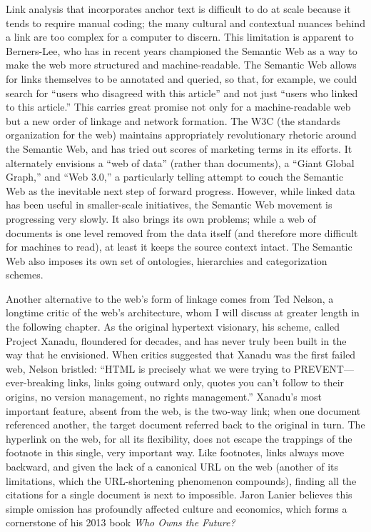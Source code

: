 Link analysis that incorporates anchor text is difficult to do at scale because it tends to require manual coding; the many cultural and contextual nuances behind a link are too complex for a computer to discern. This limitation is apparent to Berners-Lee, who has in recent years championed the Semantic Web as a way to make the web more structured and machine-readable. The Semantic Web allows for links themselves to be annotated and queried, so that, for example, we could search for ``users who disagreed with this article'' and not just ``users who linked to this article.'' This carries great promise not only for a machine-readable web but a new order of linkage and network formation. The W3C (the standards organization for the web) maintains appropriately revolutionary rhetoric around the Semantic Web, and has tried out scores of marketing terms in its efforts. It alternately envisions a ``web of data'' (rather than documents), a ``Giant Global Graph,'' and ``Web 3.0,'' a particularly telling attempt to couch the Semantic Web as the inevitable next step of forward progress. However, while linked data has been useful in smaller-scale initiatives, the Semantic Web movement is progressing very slowly. It also brings its own problems; while a web of documents is one level removed from the data itself (and therefore more difficult for machines to read), at least it keeps the source context intact. The Semantic Web also imposes its own set of ontologies, hierarchies and categorization schemes.

Another alternative to the web's form of linkage comes from Ted Nelson, a longtime critic of the web's architecture, whom I will discuss at greater length in the following chapter. As the original hypertext visionary, his scheme, called Project Xanadu, floundered for decades, and has never truly been built in the way that he envisioned. When critics suggested that Xanadu was the first failed web, Nelson bristled: ``HTML is precisely what we were trying to PREVENT—ever-breaking links, links going outward only, quotes you can't follow to their origins, no version management, no rights management.''  Xanadu's most important feature, absent from the web, is the two-way link; when one document referenced another, the target document referred back to the original in turn. The hyperlink on the web, for all its flexibility, does not escape the trappings of the footnote in this single, very important way. Like footnotes, links always move backward, and given the lack of a canonical URL on the web (another of its limitations, which the URL-shortening phenomenon compounds), finding all the citations for a single document is next to impossible. Jaron Lanier believes this simple omission has profoundly affected culture and economics, which forms a cornerstone of his 2013 book \emph{Who Owns the Future?} 

